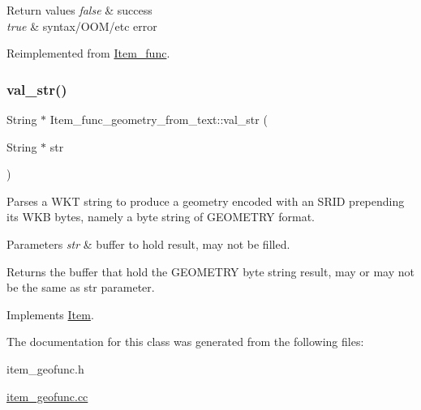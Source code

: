 \begin{DoxyRetVals}{Return values}
{\em false} & success \\
\hline
{\em true} & syntax/\+O\+O\+M/etc error \\
\hline
\end{DoxyRetVals}


Reimplemented from \mbox{\hyperlink{classItem__func_a6413cdbe7b14be77cc47462c9fc87ddb}{Item\+\_\+func}}.

\mbox{\label{classItem__func__geometry__from__text_ae1cb35368411da4e3a20181f51b0c818}} 
\subsubsection{\texorpdfstring{val\+\_\+str()}{val\_str()}}
{\footnotesize\ttfamily String $\ast$ Item\+\_\+func\+\_\+geometry\+\_\+from\+\_\+text\+::val\+\_\+str (\begin{DoxyParamCaption}\item[{String $\ast$}]{str }\end{DoxyParamCaption})\hspace{0.3cm}{\ttfamily [virtual]}}

Parses a W\+KT string to produce a geometry encoded with an S\+R\+ID prepending its W\+KB bytes, namely a byte string of G\+E\+O\+M\+E\+T\+RY format. 
\begin{DoxyParams}{Parameters}
{\em str} & buffer to hold result, may not be filled. \\
\hline
\end{DoxyParams}
\begin{DoxyReturn}{Returns}
the buffer that hold the G\+E\+O\+M\+E\+T\+RY byte string result, may or may not be the same as \textquotesingle{}str\textquotesingle{} parameter. 
\end{DoxyReturn}


Implements \mbox{\hyperlink{classItem}{Item}}.



The documentation for this class was generated from the following files\+:\begin{DoxyCompactItemize}
\item 
item\+\_\+geofunc.\+h\item 
\mbox{\hyperlink{item__geofunc_8cc}{item\+\_\+geofunc.\+cc}}\end{DoxyCompactItemize}
